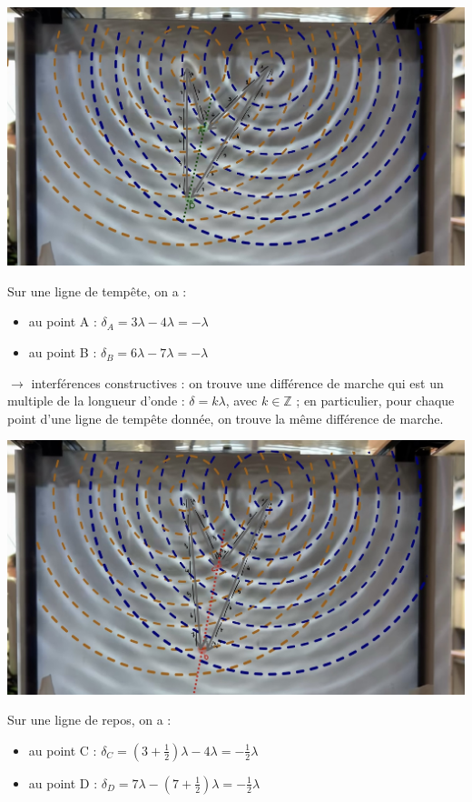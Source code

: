 \documentclass{report}
\begin{document}
\begin{minipage}{0.6\textwidth}
  \includegraphics[scale=0.16]{calcul_tempête.jpg}
\end{minipage}
\hfill
\begin{minipage}{0.4\textwidth}
  Sur une ligne de tempête, on a :
\begin{itemize}
    \item au point A : $\delta_A = 3 \lambda - 4\lambda = -\lambda$
    \item au point B : $\delta_B = 6 \lambda - 7\lambda = -\lambda$
\end{itemize}
\end{minipage}
\newline

$\rightarrow$ interférences constructives : on trouve une différence de marche qui est un multiple de la longueur d'onde : $\delta = k \lambda$, avec $k \in \mathbb{Z}$ ; en particulier, pour chaque point d'une ligne de tempête donnée, on trouve la même différence de marche.
\newline


\begin{minipage}{0.6\textwidth}
\includegraphics[scale=0.16]{calcul_repos.jpg}
\end{minipage}
\hfill
\begin{minipage}{0.4\textwidth}
  Sur une ligne de repos, on a :
\begin{itemize}
    \item au point C : $\delta_C = (3+\frac{1}{2}) \lambda - 4\lambda = -\frac{1}{2}\lambda$
    \item au point D : $\delta_D = 7 \lambda - (7+\frac{1}{2})\lambda = -\frac{1}{2}\lambda$
\end{itemize}
\end{minipage}
\newline
\end{document}
